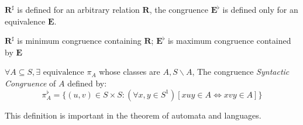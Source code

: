\begin{Rmk}
    $\mathbf{R}^{\sharp}$ is defined for an arbitrary relation $\mathbf{R}$, the congruence $\mathbf{E}^{\flat}$ is defined only for an equivalence $\mathbf{E}$.

    $\mathbf{R}^{\sharp}$ is minimum congruence containing $\mathbf{R}$; $\mathbf{E}^{\flat}$ is maximum congruence contained by $\mathbf{E}$
\end{Rmk}

\begin{Def}
    $\forall A \subseteq S, \exists \text{ equivalence } \pi_A$ whose classes are $A, S\backslash A$, The congruence \emph{Syntactic Congruence} of $A$ defined by:
    \[\pi_A^{\flat} = \{(u,v)\in S \times S : (\forall x,y\in S^1)[xuy \in A \Leftrightarrow xvy \in A]\}\]

    This definition is important in the theorem of automata and languages.
\end{Def}

